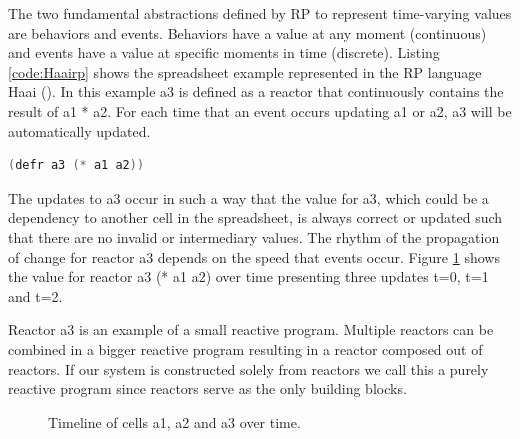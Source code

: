 \documentclass[a4paper]{book}
\begin{document}
The two fundamental abstractions defined by RP to represent time-varying values are behaviors and events. Behaviors have a value at any moment (continuous) and events have a value at specific moments in time (discrete). 
Listing \ref{code:Haairp} shows the spreadsheet example represented in the RP language Haai (\cite{oeyen_reactive_2024}).
In this example a3 is defined as a reactor that continuously contains the result of a1 * a2. For each time that an event occurs updating a1 or a2, a3 will be automatically updated. 

\newpage

\begin{lstlisting}[language=C, caption={Haai code}, captionpos=b, label={code:Haairp}, basicstyle=\ttfamily, frame=single]
	(defr a3 (* a1 a2))
\end{lstlisting}

The updates to a3 occur in such a way that the value for a3, which could be a dependency to another cell in the spreadsheet, is always correct or updated such that there are no invalid or intermediary values. The rhythm of the propagation of change for reactor a3 depends on the speed that events occur. Figure \ref{fig:a3} shows the value for reactor a3 (* a1 a2) over time presenting three updates t=0, t=1 and t=2. 

Reactor a3 is an example of a small reactive program. Multiple reactors can be combined in a bigger reactive program resulting in a reactor composed out of reactors. If our system is constructed solely from reactors we call this a purely reactive program since reactors serve as the only building blocks.


\begin{figure}[h]
	\centering
{}
    \caption{Timeline of cells a1, a2 and a3 over time.}
\label{fig:a3}
\end{figure}
     
\end{document}
